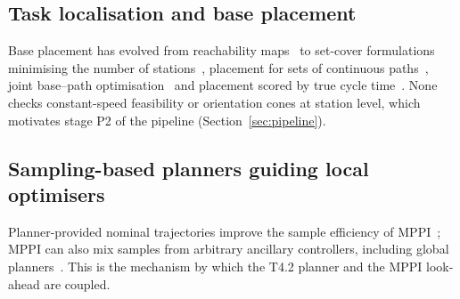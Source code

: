 \subsection{Task localisation and base placement}
Base placement has evolved from reachability maps~\cite{makhal2018reuleaux} to set-cover formulations minimising the number of stations~\cite{nguyen2023taskclustering}, placement for sets of continuous paths~\cite{weingartshofer2021tcpbase}, joint base--path optimisation~\cite{zhao2025bstar} and placement scored by true cycle time~\cite{wachter2024tcpbase}. None checks constant-speed feasibility or orientation cones at station level, which motivates stage P2 of the pipeline (Section~\ref{sec:pipeline}).

\subsection{Sampling-based planners guiding local optimisers}
Planner-provided nominal trajectories improve the sample efficiency of MPPI~\cite{tao2023rrtmppi}; MPPI can also mix samples from arbitrary ancillary controllers, including global planners~\cite{trevisan2024biasedmppi}. This is the mechanism by which the T4.2 planner and the MPPI look-ahead are coupled.
